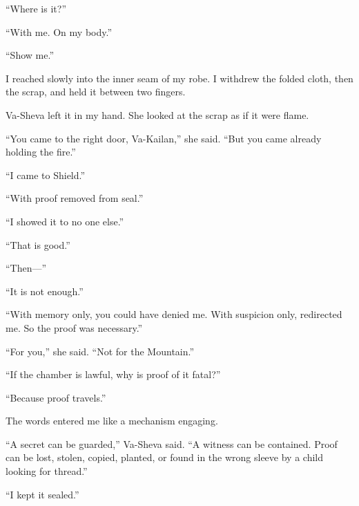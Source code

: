 ``Where is it?''\par

``With me. On my body.''\par

``Show me.''\par

I reached slowly into the inner seam of my robe. I withdrew the folded cloth, then the scrap, and held it between two fingers.\par

Va-Sheva left it in my hand. She looked at the scrap as if it were flame.\par

``You came to the right door, Va-Kailan,'' she said. ``But you came already holding the fire.''\par

``I came to Shield.''\par

``With proof removed from seal.''\par

``I showed it to no one else.''\par

``That is good.''\par

``Then---''\par

``It is not enough.''\par

``With memory only, you could have denied me. With suspicion only, redirected me. So the proof was necessary.''\par

``For you,'' she said. ``Not for the Mountain.''\par

``If the chamber is lawful, why is proof of it fatal?''\par

``Because proof travels.''\par

The words entered me like a mechanism engaging.\par

\ornament

``A secret can be guarded,'' Va-Sheva said. ``A witness can be contained. Proof can be lost, stolen, copied, planted, or found in the wrong sleeve by a child looking for thread.''\par

``I kept it sealed.''\par

